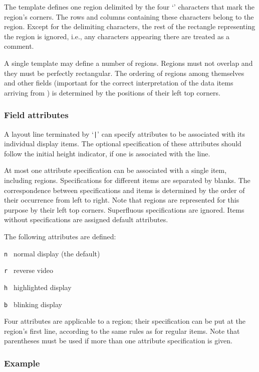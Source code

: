 The template defines one region delimited by the four `{\tt {}}' characters
that mark the region's corners.
The rows and columns containing these characters belong to the region.
Except for the delimiting characters, the rest of the rectangle representing
the region is ignored, i.e.,
any characters appearing there are treated as a comment.

A single template may define a number of regions.
Regions must not overlap and they must be perfectly rectangular.
The ordering of regions among themselves and other fields (important for
the correct interpretation of the data items arriving from \smurph) is
determined by the positions of their left top corners.

\subsubsection{Field attributes}
\label{rm_ds_tp_at}

A layout line terminated by `{\tt |}' can specify attributes to be associated
with its individual display items.
The optional specification of these attributes should follow the initial
height indicator, if one is associated with the line.

At most one attribute specification can be associated with a single item,
including regions.
Specifications for different items are separated by blanks.
The correspondence between specifications and items is determined by the
order of their occurrence from left to right.
Note that regions are represented for this purpose by their left top
corners.
Superfluous specifications are ignored.
Items without specifications are assigned default attributes.

The following attributes are defined:

\bigskip

\noindent
{\tt n~} normal display (the default)

\noindent
{\tt r~} reverse video

\noindent
{\tt h~} highlighted display

\noindent
{\tt b~} blinking display

\bigskip

Four attributes are applicable to a region; their specification can be put
at the region's first line, according to the same rules as for regular items.
Note that parentheses must be used if more than one attribute specification is
given. 

\subsubsection*{Example}

